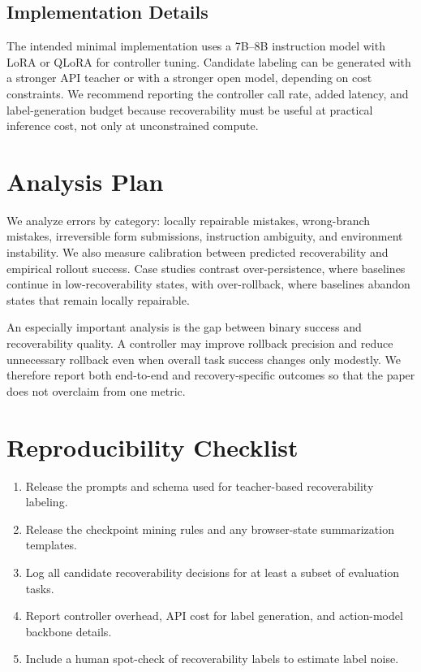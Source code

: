 \documentclass[11pt]{article}
\begin{document}
\subsection{Implementation Details}
The intended minimal implementation uses a 7B--8B instruction model with LoRA or QLoRA for controller tuning. Candidate labeling can be generated with a stronger API teacher or with a stronger open model, depending on cost constraints. We recommend reporting the controller call rate, added latency, and label-generation budget because recoverability must be useful at practical inference cost, not only at unconstrained compute.

\section{Analysis Plan}
We analyze errors by category: locally repairable mistakes, wrong-branch mistakes, irreversible form submissions, instruction ambiguity, and environment instability. We also measure calibration between predicted recoverability and empirical rollout success. Case studies contrast over-persistence, where baselines continue in low-recoverability states, with over-rollback, where baselines abandon states that remain locally repairable.

An especially important analysis is the gap between binary success and recoverability quality. A controller may improve rollback precision and reduce unnecessary rollback even when overall task success changes only modestly. We therefore report both end-to-end and recovery-specific outcomes so that the paper does not overclaim from one metric.

\section{Reproducibility Checklist}
\begin{enumerate}[leftmargin=*]
    \item Release the prompts and schema used for teacher-based recoverability labeling.
    \item Release the checkpoint mining rules and any browser-state summarization templates.
    \item Log all candidate recoverability decisions for at least a subset of evaluation tasks.
    \item Report controller overhead, API cost for label generation, and action-model backbone details.
    \item Include a human spot-check of recoverability labels to estimate label noise.
\end{enumerate}
\end{document}
